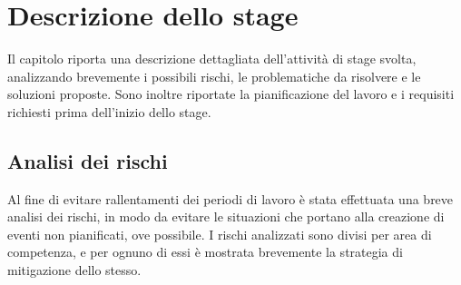 
\chapter{Descrizione dello stage}
\label{cap:descrizione-stage}

Il capitolo riporta una descrizione dettagliata dell'attività di stage svolta, analizzando brevemente i possibili rischi, le problematiche da risolvere e le soluzioni proposte. Sono inoltre riportate la pianificazione del lavoro e i requisiti richiesti prima dell'inizio dello stage. 

\section{Analisi dei rischi}

Al fine di evitare rallentamenti dei periodi di lavoro è stata effettuata una breve analisi dei
rischi, in modo da evitare le situazioni che portano alla creazione di eventi non pianificati,
ove possibile. 
I rischi analizzati sono divisi per area di competenza, e per ognuno di essi è mostrata brevemente la strategia di mitigazione dello stesso.

